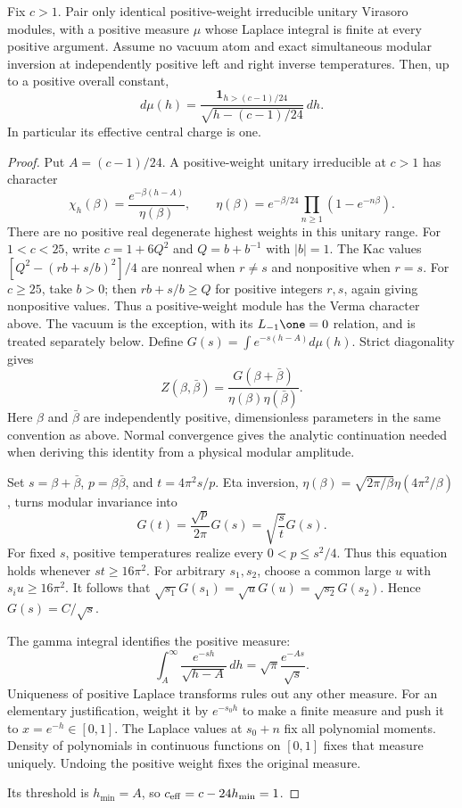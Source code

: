 \begin{proposition}\label{prop:c-continuum}
Fix $c>1$. Pair only identical positive-weight irreducible unitary
Virasoro modules, with a positive measure $\mu$ whose Laplace
integral is finite at every positive argument. Assume no vacuum atom
and exact simultaneous modular inversion at independently positive
left and right inverse temperatures. Then, up to a positive overall
constant,
\[
 d\mu(h)=\frac{\mathbf1_{h>(c-1)/24}}{
                     \sqrt{h-(c-1)/24}}\,dh.
\]
In particular its effective central charge is one.
\end{proposition}
\begin{proof}
Put $A=(c-1)/24$. A positive-weight unitary irreducible at $c>1$
has character
\[
 \chi_h(\beta)=\frac{e^{-\beta(h-A)}}{\eta(\beta)},
\qquad\eta(\beta)=e^{-\beta/24}
                               \prod_{n\geq1}(1-e^{-n\beta}).
\]
There are no positive real degenerate highest weights in this
unitary range. For $1<c<25$, write $c=1+6Q^2$ and
$Q=b+b^{-1}$ with $|b|=1$. The Kac values
$[Q^2-(rb+s/b)^2]/4$ are nonreal when $r\ne s$ and
nonpositive when $r=s$. For $c\geq25$, take $b>0$;
then $rb+s/b\geq Q$ for positive integers $r,s$, again giving
nonpositive values. Thus a positive-weight module has the Verma
character above. The vacuum is the exception, with its
$L_{-1}\one=0$ relation, and is treated separately below.
Define $G(s)=\int e^{-s(h-A)}d\mu(h)$. Strict diagonality gives
\[
 Z(\beta,\bar\beta)=
                 \frac{G(\beta+\bar\beta)}{
                                      \eta(\beta)\eta(\bar\beta)}.
\]
Here $\beta$ and $\bar\beta$ are independently positive,
dimensionless parameters in the same convention as above. Normal
convergence gives the analytic continuation needed when deriving this
identity from a physical modular amplitude.

Set $s=\beta+\bar\beta$, $p=\beta\bar\beta$, and
$t=4\pi^2s/p$. Eta inversion,
$\eta(\beta)=\sqrt{2\pi/\beta}\eta(4\pi^2/\beta)$,
turns modular invariance into
\[
 G(t)=\frac{\sqrt p}{2\pi}G(s)=\sqrt{\frac{s}{t}}G(s).
\]
For fixed $s$, positive temperatures realize every
$0<p\leq s^2/4$. Thus this equation holds whenever
$st\geq16\pi^2$. For arbitrary $s_1,s_2$, choose a common large
$u$ with $s_i u\geq16\pi^2$. It follows that
$\sqrt{s_1}G(s_1)=\sqrt uG(u)=\sqrt{s_2}G(s_2)$.
Hence $G(s)=C/\sqrt s$.

The gamma integral identifies the positive measure:
\[
 \int_A^\infty\frac{e^{-sh}}{\sqrt{h-A}}\,dh
                          =\sqrt\pi\frac{e^{-As}}{\sqrt s}.
\]
Uniqueness of positive Laplace transforms rules out any other measure.
For an elementary justification, weight it by $e^{-s_0h}$ to make
a finite measure and push it to $x=e^{-h}\in[0,1]$. The Laplace
values at $s_0+n$ fix all polynomial moments. Density of polynomials
in continuous functions on $[0,1]$ fixes that measure uniquely.
Undoing the positive weight fixes the original measure.

Its threshold is $h_{\min}=A$, so
$c_{\rm eff}=c-24h_{\min}=1$.
\end{proof}

